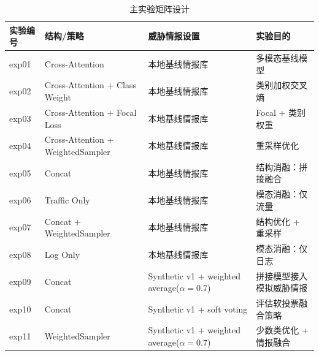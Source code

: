 \begin{table}[H]
\centering
\caption{主实验矩阵设计}
\label{tab:matrix}
\begin{tabular}{p{2.3cm}p{3.2cm}p{2.5cm}p{4.9cm}}
\toprule
实验编号 & 结构/策略 & 威胁情报设置 & 实验目的 \\
\midrule
exp01 & Cross-Attention & 本地基线情报库 & 多模态基线模型 \\
exp02 & Cross-Attention + Class Weight & 本地基线情报库 & 类别加权交叉熵 \\
exp03 & Cross-Attention + Focal Loss & 本地基线情报库 & Focal + 类别权重 \\
exp04 & Cross-Attention + WeightedSampler & 本地基线情报库 & 重采样优化 \\
exp05 & Concat & 本地基线情报库 & 结构消融：拼接融合 \\
exp06 & Traffic Only & 本地基线情报库 & 模态消融：仅流量 \\
exp07 & Concat + WeightedSampler & 本地基线情报库 & 结构优化 + 重采样 \\
exp08 & Log Only & 本地基线情报库 & 模态消融：仅日志 \\
exp09 & Concat & Synthetic v1 + weighted average($\alpha=0.7$) & 拼接模型接入模拟威胁情报 \\
exp10 & Concat & Synthetic v1 + soft voting & 评估软投票融合策略 \\
exp11 & WeightedSampler & Synthetic v1 + weighted average($\alpha=0.7$) & 少数类优化 + 情报融合 \\
\bottomrule
\end{tabular}
\end{table}
